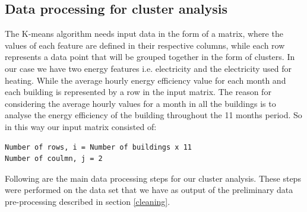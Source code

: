 \subsection{Data processing for cluster analysis}
The K-means algorithm needs input data in the form of a matrix, where the values of each feature are defined in their respective columns, while each row represents a data point that will be grouped together in the form of clusters. In our case we have two energy features i.e. electricity and the electricity used for heating. While the average hourly energy efficiency value for each month and each building is represented by a row in the input matrix. The reason for considering the average hourly values for a month in all the buildings is to analyse the energy efficiency of the building throughout the 11 months period. So in this way our input matrix consisted of: 
\begin{lstlisting}
Number of rows, i = Number of buildings x 11 
Number of coulmn, j = 2
\end{lstlisting}
Following are the main data processing steps for our cluster analysis. These steps were performed on the data set that we have as output of the preliminary data pre-processing described in section \ref{cleaning}.

